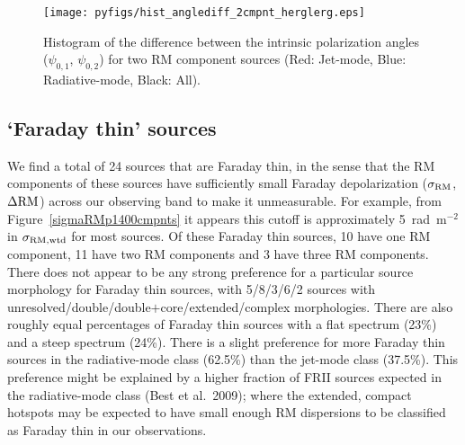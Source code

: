 \documentclass{mnras}
\newcommand*\sigmaRM{\sigma_{\rm RM}}
\newcommand*\sigmaRMwtd{\sigma_{\rm RM, wtd}}
\newcommand*\gradRM{\Delta{\rm RM}}
\begin{document}
\begin{figure} 
\centering
    \texttt{[image: pyfigs/hist\_anglediff\_2cmpnt\_herglerg.eps]} 
    \caption{ {\small Histogram of the difference between the intrinsic polarization angles ($\psi_{0,1}$, $\psi_{0,2}$) for two RM component sources 
    (Red: Jet-mode, Blue: Radiative-mode, Black: All). } }
    \label{histanglediff}
\end{figure}     

\subsection{`Faraday thin' sources}
We find a total of 24 sources that are Faraday thin, in the sense that the RM components of these sources have sufficiently small Faraday depolarization ($\sigmaRM$, $\gradRM$) across our observing band to make it unmeasurable. For example, from Figure~\ref{sigmaRMp1400cmpnts} it appears this cutoff is approximately 5~rad~m$^{-2}$ in $\sigmaRMwtd$ for most sources. Of these Faraday thin sources, 10 have one RM component, 11 have two RM components and 3 have three RM components. There does not appear to be any strong preference for a particular source morphology for Faraday thin sources, with 5/8/3/6/2 sources with unresolved/double/double$+$core/extended/complex morphologies. There are also roughly equal percentages of Faraday thin sources with a flat spectrum (23\%) and a steep spectrum (24\%). There is a slight preference for more Faraday thin sources in the radiative-mode class (62.5\%) than the jet-mode class (37.5\%). This preference might be explained by a higher fraction of FRII sources expected in the radiative-mode class (Best et al.~2009); where the extended, compact hotspots may be expected to have small enough RM dispersions to be classified as Faraday thin in our observations.  
\end{document}
